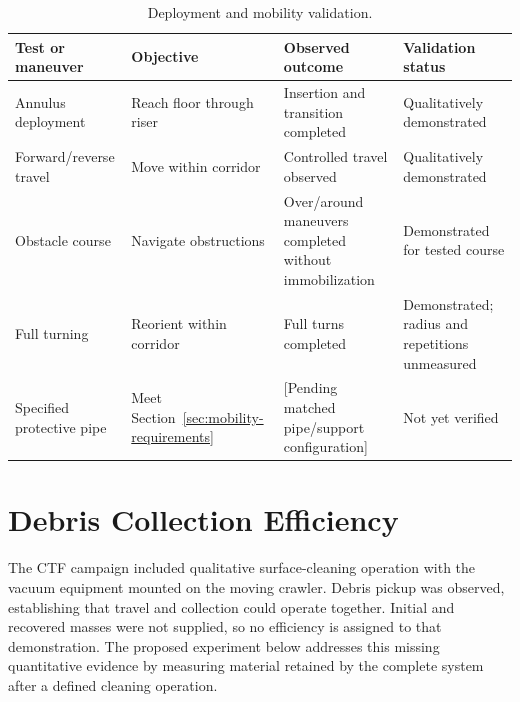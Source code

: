 \begin{table}[htbp]\centering
\caption{Deployment and mobility validation.}
\label{tab:mobility-validation}
\begingroup\small\singlespacing\renewcommand{\arraystretch}{1.2}
\begin{tabularx}{\textwidth}{@{}XXXX@{}}\toprule
Test or maneuver & Objective & Observed outcome & Validation status \\\midrule
Annulus deployment & Reach floor through riser & Insertion and transition completed & Qualitatively demonstrated \\
Forward/reverse travel & Move within corridor & Controlled travel observed & Qualitatively demonstrated \\
Obstacle course & Navigate obstructions & Over/around maneuvers completed without immobilization & Demonstrated for tested course \\
Full turning & Reorient within corridor & Full turns completed & Demonstrated; radius and repetitions unmeasured \\
Specified protective pipe & Meet Section~\ref{sec:mobility-requirements} & [Pending matched pipe/support configuration] & Not yet verified \\
\bottomrule\end{tabularx}\endgroup
\end{table}


\section{Debris Collection Efficiency}
\label{sec:recovery-tests}
The CTF campaign included qualitative surface-cleaning operation with the vacuum equipment mounted on the moving crawler. Debris pickup was observed, establishing that travel and collection could operate together. Initial and recovered masses were not supplied, so no efficiency is assigned to that demonstration. The proposed experiment below addresses this missing quantitative evidence by measuring material retained by the complete system after a defined cleaning operation.

